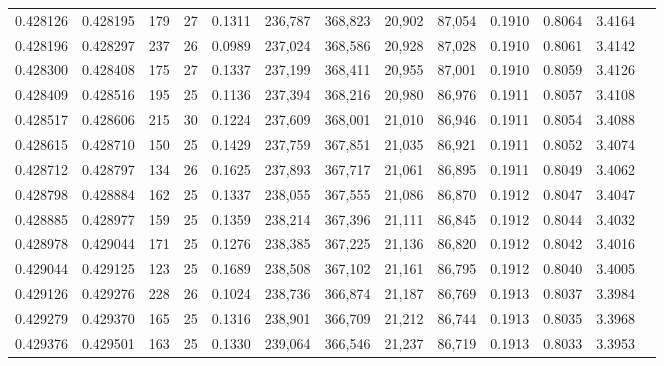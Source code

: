 \begin{tabular}{rrrrrrrrrrrrr}
0.428126 & 0.428195 & 179 &  27 &                                     0.1311 & 236,787 & 368,823 &  20,902 &  87,054 & 0.1910 & 0.8064 & 3.4164 \\
0.428196 & 0.428297 & 237 &  26 &                                     0.0989 & 237,024 & 368,586 &  20,928 &  87,028 & 0.1910 & 0.8061 & 3.4142 \\
0.428300 & 0.428408 & 175 &  27 &                                     0.1337 & 237,199 & 368,411 &  20,955 &  87,001 & 0.1910 & 0.8059 & 3.4126 \\
0.428409 & 0.428516 & 195 &  25 &                                     0.1136 & 237,394 & 368,216 &  20,980 &  86,976 & 0.1911 & 0.8057 & 3.4108 \\
0.428517 & 0.428606 & 215 &  30 &                                     0.1224 & 237,609 & 368,001 &  21,010 &  86,946 & 0.1911 & 0.8054 & 3.4088 \\
0.428615 & 0.428710 & 150 &  25 &                                     0.1429 & 237,759 & 367,851 &  21,035 &  86,921 & 0.1911 & 0.8052 & 3.4074 \\
0.428712 & 0.428797 & 134 &  26 &                                     0.1625 & 237,893 & 367,717 &  21,061 &  86,895 & 0.1911 & 0.8049 & 3.4062 \\
0.428798 & 0.428884 & 162 &  25 &                                     0.1337 & 238,055 & 367,555 &  21,086 &  86,870 & 0.1912 & 0.8047 & 3.4047 \\
0.428885 & 0.428977 & 159 &  25 &                                     0.1359 & 238,214 & 367,396 &  21,111 &  86,845 & 0.1912 & 0.8044 & 3.4032 \\
0.428978 & 0.429044 & 171 &  25 &                                     0.1276 & 238,385 & 367,225 &  21,136 &  86,820 & 0.1912 & 0.8042 & 3.4016 \\
0.429044 & 0.429125 & 123 &  25 &                                     0.1689 & 238,508 & 367,102 &  21,161 &  86,795 & 0.1912 & 0.8040 & 3.4005 \\
0.429126 & 0.429276 & 228 &  26 &                                     0.1024 & 238,736 & 366,874 &  21,187 &  86,769 & 0.1913 & 0.8037 & 3.3984 \\
0.429279 & 0.429370 & 165 &  25 &                                     0.1316 & 238,901 & 366,709 &  21,212 &  86,744 & 0.1913 & 0.8035 & 3.3968 \\
0.429376 & 0.429501 & 163 &  25 &                                     0.1330 & 239,064 & 366,546 &  21,237 &  86,719 & 0.1913 & 0.8033 & 3.3953 \\

\end{tabular}
